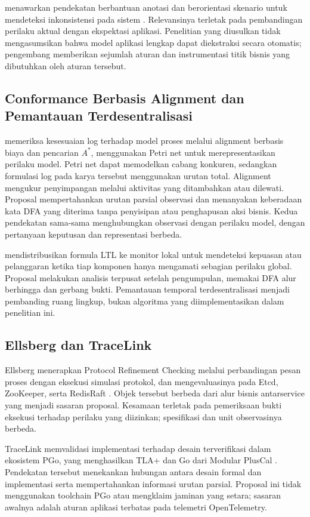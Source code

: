 \citet{sun2024} menawarkan pendekatan berbantuan anotasi dan berorientasi skenario untuk mendeteksi inkonsistensi pada sistem . Relevansinya terletak pada pembandingan perilaku aktual dengan ekspektasi aplikasi. Penelitian yang diusulkan tidak mengasumsikan bahwa model aplikasi lengkap dapat diekstraksi secara otomatis; pengembang memberikan sejumlah aturan dan instrumentasi titik bisnis yang dibutuhkan oleh aturan tersebut.

\subsection{Conformance Berbasis Alignment dan Pemantauan Terdesentralisasi}
\citet{adriansyah2011} memeriksa kesesuaian log terhadap model proses melalui alignment berbasis biaya dan pencarian $A^*$, menggunakan Petri net untuk merepresentasikan perilaku model. Petri net dapat memodelkan cabang konkuren, sedangkan formulasi log pada karya tersebut menggunakan urutan total. Alignment mengukur penyimpangan melalui aktivitas yang ditambahkan atau dilewati. Proposal mempertahankan urutan parsial observasi dan menanyakan keberadaan kata DFA yang diterima tanpa penyisipan atau penghapusan aksi bisnis. Kedua pendekatan sama-sama menghubungkan observasi dengan perilaku model, dengan pertanyaan keputusan dan representasi berbeda.

\citet{bauer2012} mendistribusikan formula LTL ke monitor lokal untuk mendeteksi kepuasan atau pelanggaran ketika tiap komponen hanya mengamati sebagian perilaku global. Proposal melakukan analisis terpusat setelah pengumpulan, memakai DFA alur berhingga dan gerbang bukti. Pemantauan temporal terdesentralisasi menjadi pembanding ruang lingkup, bukan algoritma yang diimplementasikan dalam penelitian ini.

\subsection{Ellsberg dan TraceLink}
Ellsberg menerapkan  Protocol Refinement Checking melalui perbandingan pesan proses dengan eksekusi simulasi protokol, dan mengevaluasinya pada Etcd, ZooKeeper, serta RedisRaft \citep{ding2025}. Objek tersebut berbeda dari alur bisnis antarservice yang menjadi sasaran proposal. Kesamaan terletak pada pemeriksaan bukti eksekusi terhadap perilaku yang diizinkan; spesifikasi dan unit observasinya berbeda.

TraceLink memvalidasi  implementasi terhadap desain terverifikasi dalam ekosistem PGo, yang menghasilkan TLA+ dan Go dari Modular PlusCal \citep{hackett2025}. Pendekatan tersebut menekankan hubungan antara desain formal dan implementasi serta mempertahankan informasi urutan parsial. Proposal ini tidak menggunakan toolchain PGo atau mengklaim jaminan yang setara; sasaran awalnya adalah aturan aplikasi terbatas pada telemetri OpenTelemetry.

